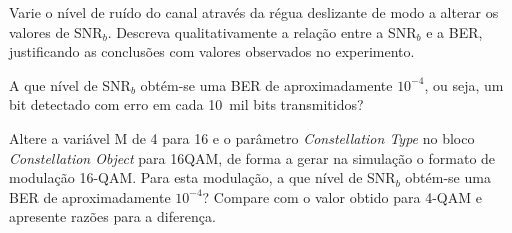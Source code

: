 \documentclass[12pt,addpoints]{exam}
\begin{document}
\begin{questions}
     \question Varie o nível de ruído do canal através da régua deslizante de modo a alterar os valores de SNR$_b$. Descreva qualitativamente a relação entre a SNR$_b$ e a BER, justificando as conclusões com valores observados no experimento.
     \fillwithlines{1.25in}
    
     \question A que nível de SNR$_b$ obtém-se uma BER de aproximadamente $10^{-4}$, ou seja, um bit detectado com erro em cada 10~mil bits transmitidos?
     \fillwithlines{0.25in}
    
     \question Altere a variável M de 4 para 16 e o parâmetro {\it Constellation Type} no bloco {\it Constellation Object} para 16QAM, de forma a gerar na simulação o formato de modulação 16-QAM. Para esta modulação, a que nível de SNR$_b$ obtém-se uma BER de aproximadamente $10^{-4}$? Compare com o valor obtido para 4-QAM e apresente razões para a diferença.
    
    \fillwithlines{1in}
 \end{questions}
\end{document}
